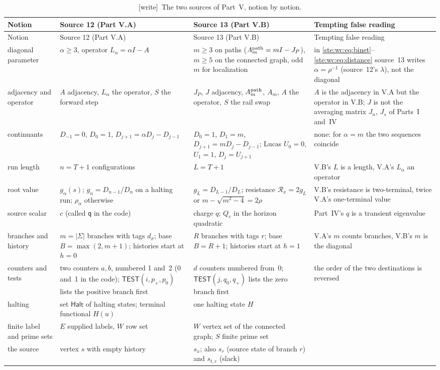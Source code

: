 \documentclass[11pt,letterpaper]{article}
\theoremstyle{definition}
\theoremstyle{remark}
\newcommand{\Halt}{\mathsf{Halt}}
\newcommand{\TEST}{\mathsf{TEST}}
\newcommand{\test}{\mathsf{TEST}}
\newcommand{\wtag}{\textup{[write]}}
\begin{document}
\begin{longtable}{@{}L{0.17\textwidth}L{0.25\textwidth}L{0.25\textwidth}L{0.24\textwidth}@{}}
\caption{\wtag\ The two sources of Part~V, notion by notion.}\label{ste:cg:tab:conventions}\\
\toprule
Notion & Source 12 (Part V.A) & Source 13 (Part V.B) & Tempting false reading\\
\midrule
\endfirsthead
\toprule
Notion & Source 12 (Part V.A) & Source 13 (Part V.B) & Tempting false reading\\
\midrule
\endhead
\bottomrule
\endfoot
diagonal parameter & $\alpha\geq3$, operator $L_\alpha=\alpha I-A$ & $m\geq3$ on paths ($A^{\rm path}_m=mI-J_P$), $m\geq5$ on the connected graph, odd $m$ for localization & in \eqref{ste:wc:eq:binet}--\eqref{ste:wc:eq:distance} source~13 writes $\alpha=\rho^{-1}$ (source~12's $\lambda$), not the diagonal\\
adjacency and operator & $A$ adjacency, $L_\alpha$ the operator, $S$ the forward step & $J_P$, $J$ adjacency, $A^{\rm path}_m$, $A_m$, $A$ the operator, $S$ the rail swap & $A$ is the adjacency in V.A but the operator in V.B; $J$ is not the averaging matrix $J_n$, $J_s$ of Parts~I and~IV\\
continuants & $D_{-1}=0$, $D_0=1$, $D_{j+1}=\alpha D_j-D_{j-1}$ & $D_0=1$, $D_1=m$, $D_{j+1}=mD_j-D_{j-1}$; Lucas $U_0=0$, $U_1=1$, $D_j=U_{j+1}$ & none: for $\alpha=m$ the two sequences coincide\\
run length & $n=T+1$ configurations & $L=T+1$ & V.B's $L$ is a length, V.A's $L_\alpha$ an operator\\
root value & $g_\alpha(s)$; $g_n=D_{n-1}/D_n$ on a halting run; $\rho_\alpha$ otherwise & $g_L=D_{L-1}/D_L$; resistance $\mathcal R_x=2g_L$ or $m-\sqrt{m^2-4}=2\rho$ & V.B's resistance is two-terminal, twice V.A's one-terminal value\\
source scalar & $c$ (called \texttt{q} in the code) & charge $q$; $Q_c$ in the horizon quadratic & Part~IV's $q$ is a transient eigenvalue\\
branches and history & $m=\lvert\Sigma\rvert$ branches with tags $d_\sigma$; base $B=\max(2,m+1)$; histories start at $h=0$ & $R$ branches with tags $r$; base $B=R+1$; histories start at $h=1$ & V.A's $m$ counts branches, V.B's $m$ is the diagonal\\
counters and tests & two counters $a,b$, numbered 1 and~2 (0 and~1 in the code); $\TEST(i,p_+,p_0)$ lists the positive branch first & $d$ counters numbered from~0; $\test(j,q_0,q_+)$ lists the zero branch first & the order of the two destinations is reversed\\
halting & set $\Halt$ of halting states; terminal functional $H(u)$ & one halting state $H$ & \\
finite label and prime sets & $E$ supplied labels, $W$ row set & $W$ vertex set of the connected graph; $S$ finite prime set & \\
the source & vertex $s$ with empty history & $s_x$; also $s_r$ (source state of branch $r$) and $s_{t,r}$ (slack) & \\
\end{longtable}
\end{document}
